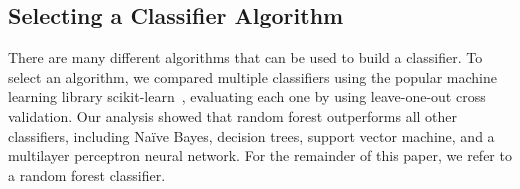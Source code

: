 \subsection{Selecting a Classifier Algorithm}

There are many different algorithms that can be used to build a classifier. To select an
algorithm, we compared multiple classifiers using the popular machine learning library scikit-learn~\cite{pedregosa11},  evaluating each one by using leave-one-out cross validation. Our analysis showed that random forest outperforms all other classifiers, including Na\"ive Bayes, decision trees, support vector machine, and a multilayer perceptron neural network. For the remainder of this paper, we refer to a random forest classifier.%



